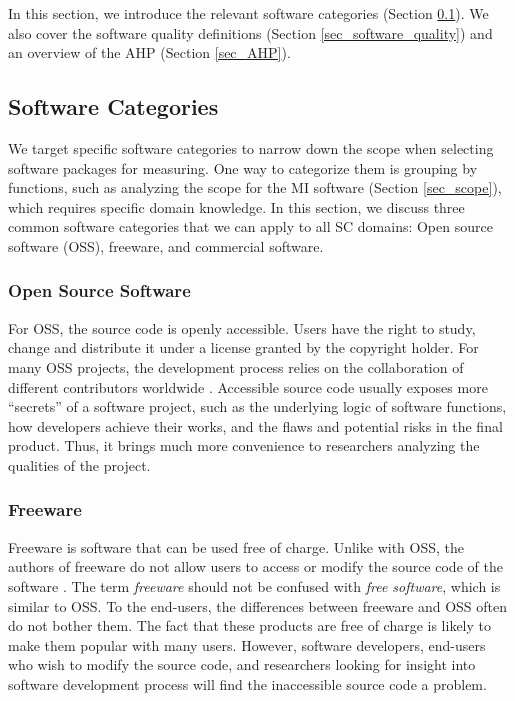 \documentclass[preprint,12pt,authoryear]{elsarticle}
\begin{document}
In this section, we introduce the relevant software categories (Section
\ref{sec_software_categories}). We also cover the software quality definitions
(Section \ref{sec_software_quality}) and an overview of the AHP (Section
\ref{sec_AHP}).

\subsection{Software Categories} \label{sec_software_categories}

We target specific software categories to narrow down the scope when selecting
software packages for measuring. One way to categorize them is grouping by
functions, such as analyzing the scope for the MI software (Section
\ref{sec_scope}), which requires specific domain knowledge. In this section, we
discuss three common software categories that we can apply to all SC domains:
Open source software (OSS), freeware, and commercial software.

\subsubsection{Open Source Software} \label{sec_open_source_software}

For OSS, the source code is openly accessible. Users have the right to study,
change and distribute it under a license granted by the copyright holder. For
many OSS projects, the development process relies on the collaboration of
different contributors worldwide \citep{Corbly2014}. Accessible source code
usually exposes more ``secrets'' of a software project, such as the underlying
logic of software functions, how developers achieve their works, and the flaws
and potential risks in the final product. Thus, it brings much more convenience
to researchers analyzing the qualities of the project.

\subsubsection{Freeware} \label{sec_freeware}

Freeware is software that can be used free of charge. Unlike with OSS, the
authors of freeware do not allow users to access or modify the source code of
the software \citep{LINFO2006}. The term \textit{freeware} should not be confused
with \textit{free software}, which is similar to OSS. To the end-users, the
differences between freeware and OSS often do not bother them. The fact that
these products are free of charge is likely to make them popular with many
users. However, software developers, end-users who wish to modify the source
code, and researchers looking for insight into software development process will
find the inaccessible source code a problem. 
\end{document}
